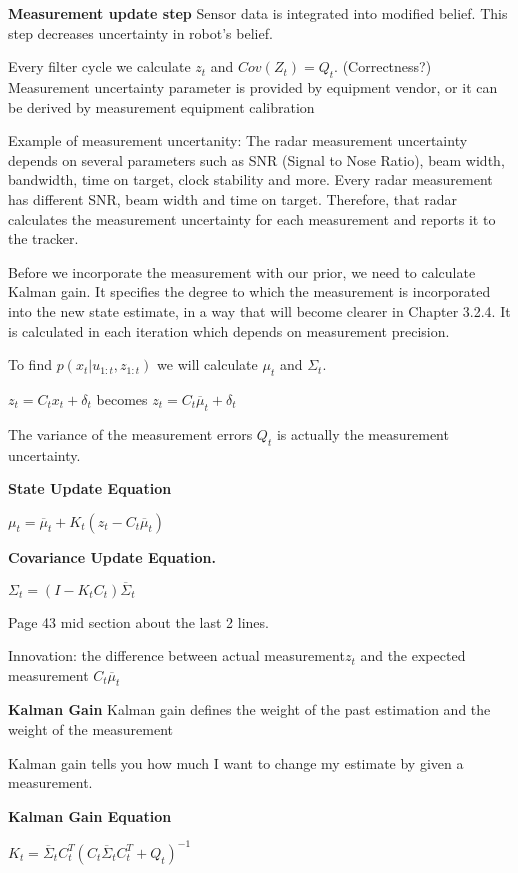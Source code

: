 \documentclass{article}
\begin{document}
\textbf{Measurement update step}
Sensor data is integrated into modified belief. This step decreases uncertainty in robot's belief.

Every filter cycle we calculate $z_t$ and $Cov(Z_t) = Q_t$. (Correctness?)
Measurement uncertainty parameter is provided by equipment vendor, or it can be derived by measurement equipment calibration
 
Example of measurement uncertanity: The radar measurement uncertainty depends on several parameters such as SNR (Signal to Nose Ratio), beam width, bandwidth, time on target, clock stability and more. Every radar measurement has different SNR, beam width and time on target. Therefore, that radar calculates the measurement uncertainty for each measurement and reports it to the tracker.


Before we incorporate the measurement with our prior, we need to calculate Kalman gain. It specifies the degree to which the measurement is incorporated into the new state estimate, in a way that will become clearer in Chapter 3.2.4. It is calculated in each iteration which depends on measurement precision.

To find $p(x_t | u_{1:t}, z_{1:t})$ we will calculate $\mu_t$ and $\Sigma_t$.

$z_t = C_t x_t + \delta_t$ becomes $z_t = C_t \overline{\mu}_t + \delta_t$

The variance of the measurement errors $Q_t$  is actually the measurement uncertainty.

\textbf{State Update Equation}

$\mu_t = \overline{\mu}_t + K_t ( z_t - C_t \overline{\mu}_t)$ 

\textbf{Covariance Update Equation.}

$\Sigma_t = (I - K_t C_t) \overline{\Sigma}_t$

Page 43 mid section about the last 2 lines.


Innovation: the difference between actual measurement$z_t$ and the expected measurement $C_t \overline{\mu}_t$

\textbf{Kalman Gain}
Kalman gain defines the weight of the past estimation and the weight of the measurement

Kalman gain tells you how much I want to change my estimate by given a measurement.

\textbf{Kalman Gain Equation}

$K_t = \overline{\Sigma}_t C_t^T (C_t \overline{\Sigma}_t C_t^T + Q_t)^{-1}$
\end{document}
